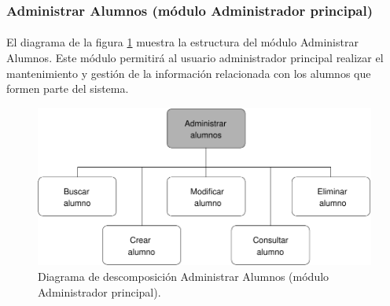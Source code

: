 \subsubsection{Administrar Alumnos (módulo Administrador principal)}

  \paragraph{}El diagrama de la figura
  \ref{diagramaDescomposicionAdministrarAlumnos} muestra la estructura del
  módulo Administrar Alumnos. Este módulo permitirá al usuario administrador
  principal realizar el mantenimiento y gestión de la información relacionada
  con los alumnos que formen parte del sistema.

  \begin{figure}[!ht]
    \begin{center}
      \includegraphics[]{11.Disenyo_Arquitectonico/11.2.Diagramas_Descomposicion/11.2.2.Modulo_administrador_principal/AdministrarBBDD/AdministrarUsuarios/AdministrarAlumnos/Diagramas/administrar_alumnos.pdf}
      \caption{Diagrama de descomposición Administrar Alumnos (módulo Administrador principal).}
      \label{diagramaDescomposicionAdministrarAlumnos}
    \end{center}
  \end{figure}
